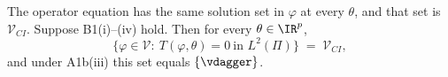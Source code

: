 %
%
%
%

\begin{corollary}\label{cor:opsol}
The operator equation has the same solution set in $\varphi$ at every $\theta$, and that set is
$\mathcal V_{CI}$.
Suppose B1(i)--(iv) hold. Then for every $\theta\in\IR^{p}$,
\[
\big\{\varphi\in\mathcal V:\ T(\varphi,\theta)=0\ \text{in }L^{2}(\Pi)\big\}\;=\;\mathcal V_{CI},
\]
and under A1b(iii) this set equals $\{\vdagger\}$.
\end{corollary}

